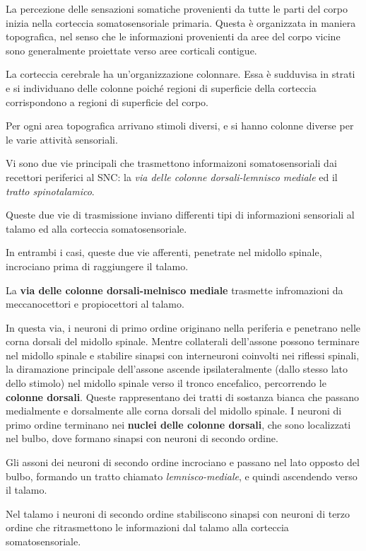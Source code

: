 \documentclass[]{article}
\begin{document}
La percezione delle sensazioni somatiche provenienti da tutte le parti
del corpo inizia nella corteccia somatosensoriale primaria. Questa è
organizzata in maniera topografica, nel senso che le informazioni
provenienti da aree del corpo vicine sono generalmente proiettate verso
aree corticali contigue.

La corteccia cerebrale ha un'organizzazione colonnare. Essa è sudduvisa
in strati e si individuano delle colonne poiché regioni di superficie
della corteccia corrispondono a regioni di superficie del corpo.

Per ogni area topografica arrivano stimoli diversi, e si hanno colonne
diverse per le varie attività sensoriali.

Vi sono due vie principali che trasmettono informaizoni somatosensoriali
dai recettori periferici al SNC: la \emph{via delle colonne
dorsali-lemnisco mediale} ed il \emph{tratto spinotalamico}.

Queste due vie di trasmissione inviano differenti tipi di informazioni
sensoriali al talamo ed alla corteccia somatosensoriale.

In entrambi i casi, queste due vie afferenti, penetrate nel midollo
spinale, incrociano prima di raggiungere il talamo.

La \textbf{via delle colonne dorsali-melnisco mediale} trasmette
infromazioni da meccanocettori e propiocettori al talamo.

In questa via, i neuroni di primo ordine originano nella periferia e
penetrano nelle corna dorsali del midollo spinale. Mentre collaterali
dell'assone possono terminare nel midollo spinale e stabilire sinapsi
con interneuroni coinvolti nei riflessi spinali, la diramazione
principale dell'assone ascende ipsilateralmente (dallo stesso lato dello
stimolo) nel midollo spinale verso il tronco encefalico, percorrendo le
\textbf{colonne dorsali}. Queste rappresentano dei tratti di sostanza
bianca che passano medialmente e dorsalmente alle corna dorsali del
midollo spinale. I neuroni di primo ordine terminano nei \textbf{nuclei
delle colonne dorsali}, che sono localizzati nel bulbo, dove formano
sinapsi con neuroni di secondo ordine.

Gli assoni dei neuroni di secondo ordine incrociano e passano nel lato
opposto del bulbo, formando un tratto chiamato \emph{lemnisco-mediale},
e quindi ascendendo verso il talamo.

Nel talamo i neuroni di secondo ordine stabiliscono sinapsi con neuroni
di terzo ordine che ritrasmettono le informazioni dal talamo alla
corteccia somatosensoriale.
\end{document}
